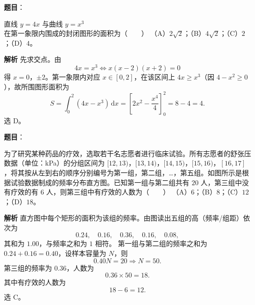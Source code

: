 \begin{answer}

\textbf{题目}：

直线 $y=4x$ 与曲线 $y=x^3$ 在第一象限内围成的封闭图形的面积为\mbox{（　　）}
（A）$2\sqrt2$；（B）$4\sqrt2$；（C）$2$；（D）$4$。

\textbf{解析}
先求交点。由
\nopagebreak[4]
\[4x=x^3\iff x(x-2)(x+2)=0\]
得 $x=0$，$\pm2$。第一象限内对应 $x\in[0,2]$，在该区间上 $4x\geqslant x^3$（因 $4-x^2\geqslant0$），故所围图形面积为
\nopagebreak[4]
\[S=\int_0^2(4x-x^3)\,\mathrm dx
=\left[2x^2-\frac{x^4}4\right]_0^2=8-4=4 .\]
选 D。


\end{answer}
\begin{answer}

\textbf{题目}：

为了研究某种药品的疗效，选取若干名志愿者进行临床试验。所有志愿者的舒张压数据（单位：kPa）的分组区间为 $[12,13)$，$[13,14)$，$[14,15)$，$[15,16)$，$[16,17]$，将其按从左到右的顺序分别编号为第一组，第二组，…，第五组。如图所示是根据试验数据制成的频率分布直方图。已知第一组与第二组共有 $20$ 人，第三组中没有疗效的有 $6$ 人，则第三组中有疗效的人数为\mbox{（　　）}
（A）$6$；（B）$8$；（C）$12$；（D）$18$。
\nopagebreak[4]
\begin{center}\end{center}
\nopagebreak[4]
\textbf{解析}
直方图中每个矩形的面积为该组的频率。由图读出五组的高（频率/组距）依次为
\nopagebreak[4]
\[0.24,\quad0.16,\quad0.36,\quad0.16,\quad0.08,\]
其和为 $1.00$，与频率之和为 $1$ 相符。
第一组与第二组的频率之和为 $0.24+0.16=0.40$，设样本容量为 $N$，则
\nopagebreak[4]
\[0.40N=20\Longrightarrow N=50 .\]
第三组的频率为 $0.36$，人数为
\nopagebreak[4]
\[0.36\times50=18 .\]
其中有疗效的人数为
\nopagebreak[4]
\[18-6=12 .\]
选 C。


\end{answer}
